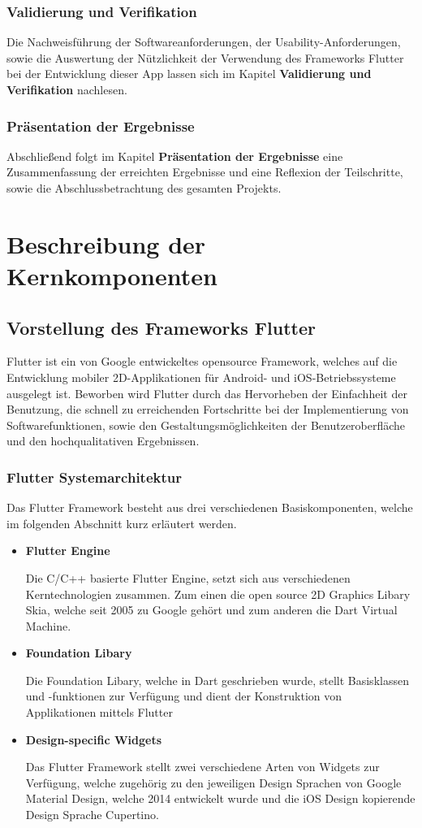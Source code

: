 \documentclass{scrreprt}
\begin{document}
\subsection{Validierung und Verifikation}
Die Nachweisführung der Softwareanforderungen, der Usability-Anforderungen, sowie die Auswertung der Nützlichkeit der Verwendung des Frameworks Flutter bei der Entwicklung dieser App lassen sich im Kapitel \textbf{Validierung und Verifikation} nachlesen.
\subsection{Präsentation der Ergebnisse}
Abschließend folgt im Kapitel \textbf{Präsentation der Ergebnisse} eine Zusammenfassung der erreichten Ergebnisse und eine Reflexion der Teilschritte, sowie die Abschlussbetrachtung des gesamten Projekts.
\chapter{Beschreibung der Kernkomponenten}
\section{Vorstellung des Frameworks Flutter}
Flutter ist ein von Google entwickeltes opensource Framework, welches auf die Entwicklung mobiler 2D-Applikationen für Android- und iOS-Betriebssysteme ausgelegt ist. Beworben wird Flutter durch das Hervorheben der Einfachheit der Benutzung, die schnell zu erreichenden Fortschritte bei der Implementierung von Softwarefunktionen, sowie den Gestaltungsmöglichkeiten der Benutzeroberfläche und den hochqualitativen Ergebnissen.
\subsection{Flutter Systemarchitektur} 
Das Flutter Framework besteht aus drei verschiedenen Basiskomponenten, welche im folgenden Abschnitt kurz erläutert werden.
\begin{itemize}
\item{\textbf{Flutter Engine}}

Die C/C++ basierte Flutter Engine, setzt sich aus verschiedenen Kerntechnologien zusammen. Zum einen die open source 2D Graphics Libary Skia\cite{Skia1}, welche seit 2005 zu Google gehört und zum anderen die Dart Virtual Machine.
\item{\textbf{Foundation Libary}}

Die Foundation Libary, welche in Dart geschrieben wurde, stellt Basisklassen und -funktionen zur Verfügung und dient der Konstruktion von Applikationen mittels Flutter
\item{\textbf{Design-specific Widgets}}

Das Flutter Framework stellt zwei verschiedene Arten von Widgets zur Verfügung, welche zugehörig zu den jeweiligen Design Sprachen von Google Material Design\cite{Mat1}, welche 2014 entwickelt wurde und die iOS Design kopierende Design Sprache Cupertino\cite{Cup1}.
\end{itemize}
\end{document}
